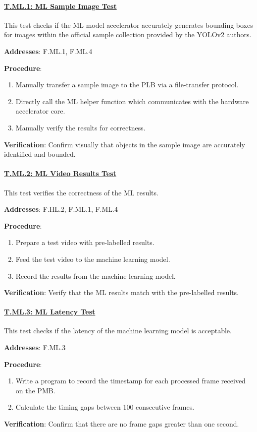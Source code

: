 \paragraph{\underline{T.ML.1: ML Sample Image Test}}

This test checks if the ML model accelerator accurately generates bounding boxes for images within the official sample collection provided by the YOLOv2 authors.

\textbf{Addresses}: F.ML.1, F.ML.4

\textbf{Procedure}:
\begin{enumerate}[noitemsep]
    \item Manually transfer a sample image to the PLB via a file-transfer protocol.
    \item Directly call the ML helper function which communicates with the hardware accelerator core.
    \item Manually verify the results for correctness.
\end{enumerate}

\textbf{Verification}: 
Confirm visually that objects in the sample image are accurately identified and bounded.

\paragraph{\underline{T.ML.2: ML Video Results Test}}

This test verifies the correctness of the ML results.

\textbf{Addresses}: F.HL.2, F.ML.1, F.ML.4

\textbf{Procedure}:
\begin{enumerate}[noitemsep]
    \item Prepare a test video with pre-labelled results.
    \item Feed the test video to the machine learning model.
    \item Record the results from the machine learning model.
\end{enumerate}

\textbf{Verification}: 
Verify that the ML results match with the pre-labelled results.

%
\paragraph{\underline{T.ML.3: ML Latency Test}}

This test checks if the latency of the machine learning model is acceptable.

\textbf{Addresses}: F.ML.3

\textbf{Procedure}:
\begin{enumerate}[noitemsep]
    \item Write a program to record the timestamp for each processed frame received on the PMB.
    \item Calculate the timing gaps between 100 consecutive frames.
\end{enumerate}

\textbf{Verification}: 
Confirm that there are no frame gaps greater than one second.